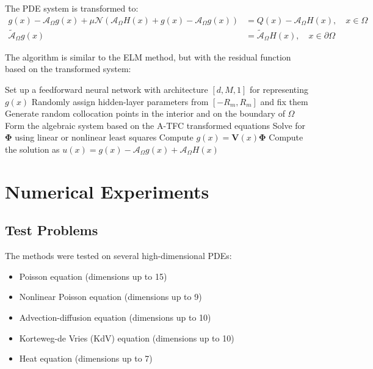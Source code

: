 \documentclass[11pt]{article}
\begin{document}
The PDE system is transformed to:
\begin{align}
    g(x) - \mathcal{A}_\Omega g(x) + \mu\mathcal{N}(\mathcal{A}_\Omega H(x) + g(x) - \mathcal{A}_\Omega g(x)) &= Q(x) - \mathcal{A}_\Omega H(x), \quad x \in \Omega\\
    \tilde{\mathcal{A}}_\Omega g(x) &= \tilde{\mathcal{A}}_\Omega H(x), \quad x \in \partial\Omega
\end{align}

The algorithm is similar to the ELM method, but with the residual function based on the transformed system:

\begin{algorithm}
\caption{ELM/A-TFC Method for High-Dimensional PDEs}
\begin{algorithmic}[1]
\State Set up a feedforward neural network with architecture $[d, M, 1]$ for representing $g(x)$
\State Randomly assign hidden-layer parameters from $[-R_m, R_m]$ and fix them
\State Generate random collocation points in the interior and on the boundary of $\Omega$
\State Form the algebraic system based on the A-TFC transformed equations
\State Solve for $\mathbf{\Phi}$ using linear or nonlinear least squares
\State Compute $g(x) = \mathbf{V}(x)\mathbf{\Phi}$
\State Compute the solution as $u(x) = g(x) - \mathcal{A}_\Omega g(x) + \mathcal{A}_\Omega H(x)$
\end{algorithmic}
\end{algorithm}

\section{Numerical Experiments}

\subsection{Test Problems}

The methods were tested on several high-dimensional PDEs:
\begin{itemize}
    \item Poisson equation (dimensions up to 15)
    \item Nonlinear Poisson equation (dimensions up to 9)
    \item Advection-diffusion equation (dimensions up to 10)
    \item Korteweg-de Vries (KdV) equation (dimensions up to 10)
    \item Heat equation (dimensions up to 7)
\end{itemize}
\end{document}
